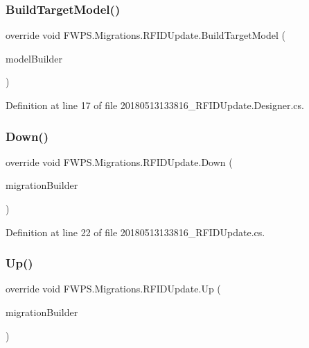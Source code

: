 \subsubsection{\texorpdfstring{Build\+Target\+Model()}{BuildTargetModel()}}
{\footnotesize\ttfamily override void F\+W\+P\+S.\+Migrations.\+R\+F\+I\+D\+Update.\+Build\+Target\+Model (\begin{DoxyParamCaption}\item[{Model\+Builder}]{model\+Builder }\end{DoxyParamCaption})\hspace{0.3cm}{\ttfamily [protected]}}



Definition at line 17 of file 20180513133816\+\_\+\+R\+F\+I\+D\+Update.\+Designer.\+cs.

\mbox{\label{class_f_w_p_s_1_1_migrations_1_1_r_f_i_d_update_a278e3eb7e70e976ebce009401a116d9b}} 
\subsubsection{\texorpdfstring{Down()}{Down()}}
{\footnotesize\ttfamily override void F\+W\+P\+S.\+Migrations.\+R\+F\+I\+D\+Update.\+Down (\begin{DoxyParamCaption}\item[{Migration\+Builder}]{migration\+Builder }\end{DoxyParamCaption})\hspace{0.3cm}{\ttfamily [protected]}}



Definition at line 22 of file 20180513133816\+\_\+\+R\+F\+I\+D\+Update.\+cs.

\mbox{\label{class_f_w_p_s_1_1_migrations_1_1_r_f_i_d_update_a88af5e9bb13f3ada4124bda9beac52a7}} 
\subsubsection{\texorpdfstring{Up()}{Up()}}
{\footnotesize\ttfamily override void F\+W\+P\+S.\+Migrations.\+R\+F\+I\+D\+Update.\+Up (\begin{DoxyParamCaption}\item[{Migration\+Builder}]{migration\+Builder }\end{DoxyParamCaption})\hspace{0.3cm}{\ttfamily [protected]}}



